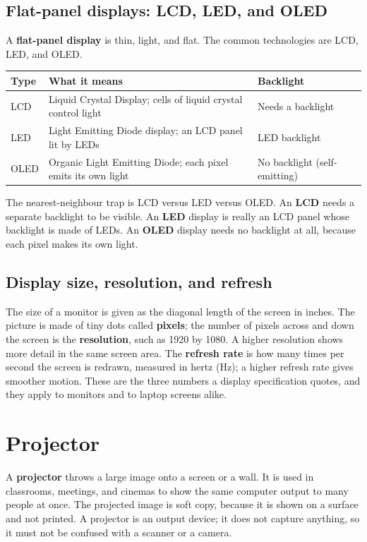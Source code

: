 \documentclass[11pt]{article}
\begin{document}
\subsection{Flat-panel displays: LCD, LED, and OLED}
A \textbf{flat-panel display} is thin, light, and flat. The common
technologies are LCD, LED, and OLED.

\begin{center}
\begin{tabular}{p{}p{}p{}}
\toprule
\textbf{Type} & \textbf{What it means} & \textbf{Backlight} \\
\midrule
LCD & Liquid Crystal Display; cells of liquid crystal control light & Needs a backlight \\
LED & Light Emitting Diode display; an LCD panel lit by LEDs & LED backlight \\
OLED & Organic Light Emitting Diode; each pixel emits its own light & No backlight (self-emitting) \\
\bottomrule
\end{tabular}
\end{center}

The nearest-neighbour trap is LCD versus LED versus OLED. An \textbf{LCD}
needs a separate backlight to be visible. An \textbf{LED} display is really an
LCD panel whose backlight is made of LEDs. An \textbf{OLED} display needs no
backlight at all, because each pixel makes its own light.

\subsection{Display size, resolution, and refresh}
The size of a monitor is given as the diagonal length of the screen in inches.
The picture is made of tiny dots called \textbf{pixels}; the number of pixels
across and down the screen is the \textbf{resolution}, such as 1920 by 1080. A
higher resolution shows more detail in the same screen area. The
\textbf{refresh rate} is how many times per second the screen is redrawn,
measured in hertz (Hz); a higher refresh rate gives smoother motion. These are
the three numbers a display specification quotes, and they apply to monitors
and to laptop screens alike.

\section{Projector}
A \textbf{projector} throws a large image onto a screen or a wall. It is used
in classrooms, meetings, and cinemas to show the same computer output to many
people at once. The projected image is soft copy, because it is shown on a
surface and not printed. A projector is an output device; it does not capture
anything, so it must not be confused with a scanner or a camera.
\end{document}
